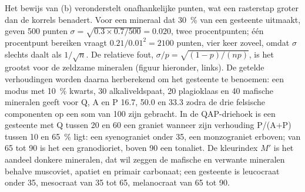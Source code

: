Het bewijs van (b) veronderstelt onafhankelijke punten, wat een rasterstap groter dan de korrels
benadert. Voor een mineraal dat \qty{30}{\percent} van een gesteente uitmaakt, geven 500 punten $\sigma =
\sqrt{0.3 \times 0.7/500} = 0.020$, twee procentpunten; één procentpunt bereiken vraagt
$0.21/0.01^2 = 2100$ punten, vier keer zoveel, omdat $\sigma$ slechts daalt als $1/\sqrt n$. De
relatieve fout, $\sigma/p = \sqrt{(1-p)/(np)}$, is het grootst voor de zeldzame mineralen (figuur hieronder,
links). De getelde verhoudingen worden daarna herberekend om het gesteente te benoemen: een modus met
\qty{10}{\percent} kwarts, 30 alkaliveldspaat, 20 plagioklaas en 40 mafische mineralen geeft voor Q, A en
P 16.7, 50.0 en 33.3 zodra de drie felsische componenten op een som van 100 zijn gebracht. In de
QAP-driehoek is een gesteente met Q tussen 20 en 60 een graniet wanneer zijn verhouding P/(A+P) tussen 10 en
\qty{65}{\percent} ligt: een syenograniet onder 35, een monzograniet erboven; van 65 tot 90 is het een
granodioriet, boven 90 een tonaliet. De kleurindex $M'$ is het aandeel donkere mineralen, dat
wil zeggen de mafische en verwante mineralen behalve muscoviet, apatiet en primair carbonaat; een gesteente is
leucocraat onder 35, mesocraat van 35 tot 65, melanocraat van 65 tot 90.

